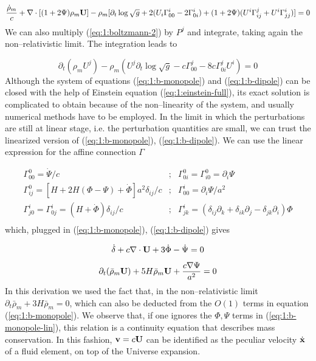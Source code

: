 \begin{equation}
\label{eq:1:b-monopole}
\frac{\dot{\rho}_m}{c} + \nabla\cdot[(1+2\Psi)\rho_m\mathbf{U}] - \rho_m[\partial_t\log \sqrt{g} +  2(U_i\Gamma^i_{00} - 2\Gamma^i_{0i}) + (1+2\Psi)(U^i\Gamma_{ij}^j+U^i\Gamma^i_{jj})] = 0
\end{equation}
%
We can also multiply (\ref{eq:1:boltzmann-2}) by $P^j$ and integrate, taking again the non--relativistic limit. The integration leads to 

\begin{equation}
\label{eq:1:b-dipole}
\partial_t(\rho_m U^j) - \rho_m (U^j\partial_t\log \sqrt{g} - c\Gamma^j_{00} - 8c\Gamma_{0i}^jU^i) = 0 
\end{equation}
%
Although the system of equations (\ref{eq:1:b-monopole}) and (\ref{eq:1:b-dipole}) can be closed with the help of Einstein equation (\ref{eq:1:einstein-full}), its exact solution is complicated to obtain because of the non--linearity of the system, and usually numerical methods have to be employed. In the limit in which the perturbations are still at linear stage, i.e. the perturbation quantities are small, we can trust the linearized version of (\ref{eq:1:b-monopole}), (\ref{eq:1:b-dipole}). We can use the linear expression for the affine connection $\Gamma$

\begin{equation}
\label{eq:1:connection}
\begin{matrix}
\Gamma_{00}^0 = \dot{\Psi}/c & ; & \Gamma_{0i}^0=\Gamma_{i0}^0 = \partial_i\Psi \\  
\Gamma_{ij}^0 = [H+2H(\Phi-\Psi)+\dot{\Phi}]a^2\delta_{ij}/c & ; & \Gamma_{00}^i = \partial_i \Psi/a^2 \\
\Gamma^i_{j0} = \Gamma^i_{0j} = (H+\dot{\Phi})\delta_{ij}/c & ; & \Gamma_{jk}^i = (\delta_{ij}\partial_k+\delta_{ik}\partial_j-\delta_{jk}\partial_i)\Phi\\
\end{matrix}
\end{equation}
%
which, plugged in (\ref{eq:1:b-monopole}), (\ref{eq:1:b-dipole}) gives 

\begin{equation}
\label{eq:1:b-monopole-lin}
\dot{\delta} + c \nabla\cdot \mathbf{U} + 3\dot{\Phi} - \dot{\Psi} = 0
\end{equation}

\begin{equation}
\label{eq:1:b-dipole-lin}
\partial_t(\bar{\rho}_m\mathbf{U}) + 5H\bar{\rho}_m\mathbf{U} + \frac{c\nabla\Psi}{a^2} = 0
\end{equation}
%
In this derivation we used the fact that, in the non--relativistic limit $\partial_t\bar{\rho}_m + 3H\bar{\rho}_m=0$, which can also be deducted from the $O(1)$ terms in equation (\ref{eq:1:b-monopole}). We observe that, if one ignores the $\Phi,\Psi$ terms in (\ref{eq:1:b-monopole-lin}), this relation is a continuity equation that describes mass conservation. In this fashion, $\mathbf{v}=c\mathbf{U}$ can be identified as the peculiar velocity $\dot{\mathbf{x}}$ of a fluid element, on top of the Universe expansion. 

